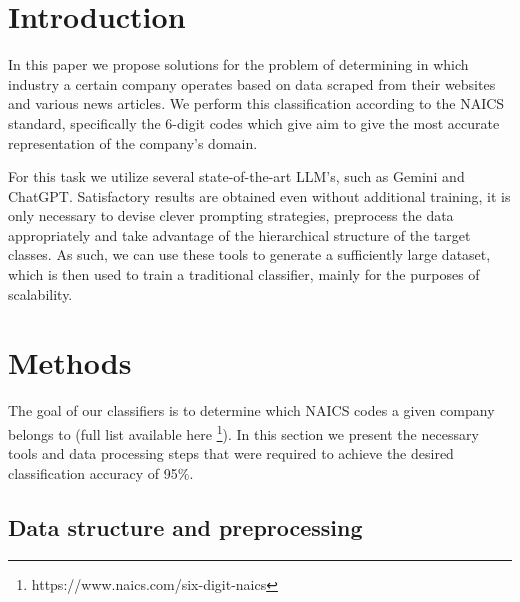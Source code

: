 \documentclass[fleqn,moreauthors,10pt]{ds_report}
\affiliation{\textit{Advisors: prof. Erik Štrumbelj}}
\begin{document}
\flushbottom 

\maketitle 

\thispagestyle{empty} 


\section*{Introduction}
 
In this paper we propose solutions for the problem of determining in which industry a certain company operates based on data scraped from their websites and various news articles. We perform this classification according to the NAICS standard, specifically the 6-digit codes which give aim to give the most accurate representation of the company's domain. 
 
For this task we utilize several state-of-the-art LLM's, such as Gemini and ChatGPT. Satisfactory results are obtained even without additional training, it is only necessary to devise clever prompting strategies, preprocess the data appropriately and take advantage of the hierarchical structure of the target classes. As such, we can use these tools to generate a sufficiently large dataset, which is then used to train a traditional classifier, mainly for the purposes of scalability. 



\section*{Methods}

The goal of our classifiers is to determine which NAICS codes a given company belongs to (full list available here \footnote{https://www.naics.com/six-digit-naics}). In this section we present the necessary tools and data processing steps that were required to achieve the desired classification accuracy of 95\%. 

\subsection*{Data structure and preprocessing}
\end{document}
